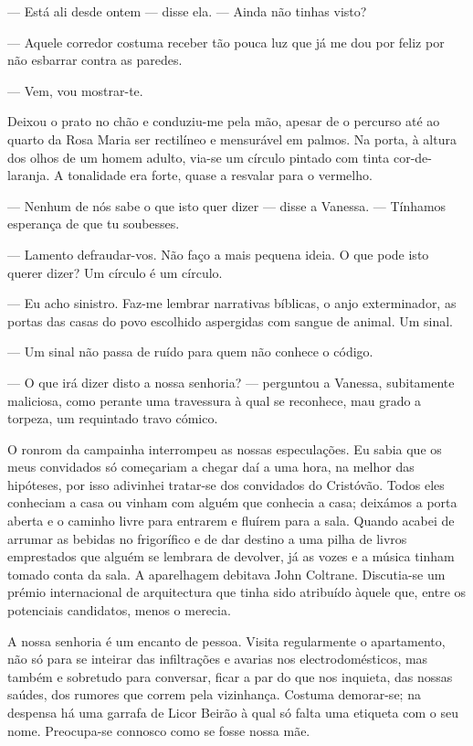 --- Está ali desde ontem --- disse ela. --- Ainda não tinhas visto?

--- Aquele corredor costuma receber tão pouca luz que já
me dou por feliz por não esbarrar contra as paredes.

--- Vem, vou mostrar-te.

Deixou o prato no chão e conduziu-me pela mão, apesar de o percurso até
ao quarto da Rosa Maria ser rectilíneo e mensurável em palmos. Na porta,
à altura dos olhos de um homem adulto, via-se um círculo pintado com
tinta cor-de-laranja. A tonalidade era forte, quase a resvalar para o vermelho.

--- Nenhum de nós sabe o que isto quer dizer --- disse a Vanessa. ---
  Tínhamos esperança de que tu soubesses.

--- Lamento defraudar-vos. Não faço a mais pequena ideia. O que pode isto
  querer dizer? Um círculo é um círculo.

--- Eu acho sinistro. Faz-me lembrar narrativas bíblicas, o anjo
  exterminador, as portas das casas do povo escolhido aspergidas com
  sangue de animal. Um sinal.

--- Um sinal não passa de ruído para quem não conhece o código.

--- O que irá dizer disto a nossa senhoria? --- perguntou a Vanessa,
  subitamente maliciosa, como perante uma travessura à qual se
  reconhece, mau grado a torpeza, um requintado travo cómico.

O ronrom da campainha interrompeu as nossas especulações. Eu sabia que
os meus convidados só começariam a chegar daí a uma hora, na melhor
das hipóteses, por isso adivinhei tratar-se dos convidados do Cristóvão.
Todos eles conheciam a casa ou vinham com alguém que conhecia a casa;
deixámos a porta aberta e o caminho livre para entrarem e fluírem para a
sala. Quando acabei de arrumar as bebidas no frigorífico e de dar
destino a uma pilha de livros emprestados que alguém se lembrara de
devolver, já as vozes e a música tinham tomado conta da sala. A
aparelhagem debitava John Coltrane.
Discutia-se um prémio internacional de arquitectura que tinha sido
atribuído àquele que, entre os potenciais candidatos, menos o merecia.


\medskip
\asterisc
\medskip

A nossa senhoria é um encanto de pessoa. Visita regularmente o
apartamento, não só para se inteirar das infiltrações e avarias nos
electrodomésticos, mas também e sobretudo para conversar, ficar a par
do que nos inquieta, das nossas saúdes, dos rumores que correm pela
vizinhança. Costuma demorar-se; na despensa há uma garrafa de Licor
Beirão à qual só falta uma etiqueta com o seu nome. Preocupa-se connosco
como se fosse nossa mãe.


